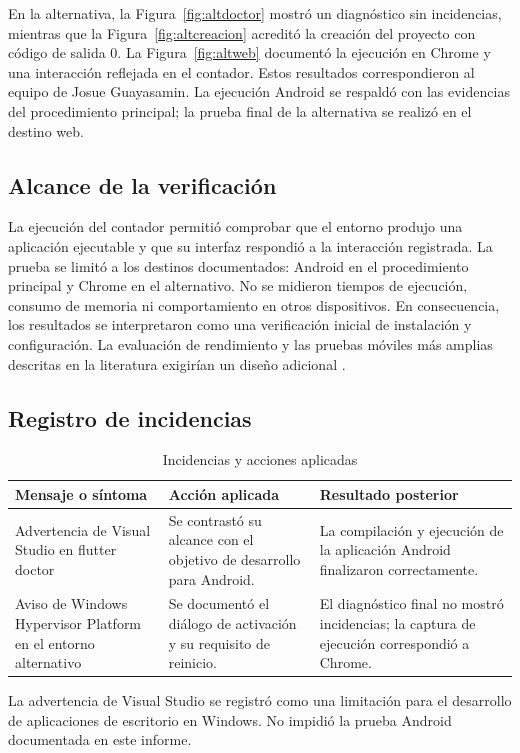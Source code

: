 \documentclass[12pt,letterpaper]{article}
\begin{document}
En la alternativa, la Figura~\ref{fig:altdoctor} mostró un diagnóstico sin incidencias, mientras que la Figura~\ref{fig:altcreacion} acreditó la creación del proyecto con código de salida 0. La Figura~\ref{fig:altweb} documentó la ejecución en Chrome y una interacción reflejada en el contador. Estos resultados correspondieron al equipo de Josue Guayasamin. La ejecución Android se respaldó con las evidencias del procedimiento principal; la prueba final de la alternativa se realizó en el destino web.

\subsection{Alcance de la verificación}
La ejecución del contador permitió comprobar que el entorno produjo una aplicación ejecutable y que su interfaz respondió a la interacción registrada. La prueba se limitó a los destinos documentados: Android en el procedimiento principal y Chrome en el alternativo. No se midieron tiempos de ejecución, consumo de memoria ni comportamiento en otros dispositivos. En consecuencia, los resultados se interpretaron como una verificación inicial de instalación y configuración. La evaluación de rendimiento y las pruebas móviles más amplias descritas en la literatura exigirían un diseño adicional \citep{biornhansen2020,muccini2012,ucinski2022}.

\subsection{Registro de incidencias}
\begin{table}[H]\centering
\caption{Incidencias y acciones aplicadas}\label{tab:incidencias}
\begin{tabular}{@{}p{4cm}p{4.5cm}p{4.3cm}@{}}\toprule
Mensaje o síntoma & Acción aplicada & Resultado posterior \\\midrule
Advertencia de Visual Studio en flutter doctor & Se contrastó su alcance con el objetivo de desarrollo para Android. & La compilación y ejecución de la aplicación Android finalizaron correctamente. \\
Aviso de Windows Hypervisor Platform en el entorno alternativo & Se documentó el diálogo de activación y su requisito de reinicio. & El diagnóstico final no mostró incidencias; la captura de ejecución correspondió a Chrome. \\
\bottomrule
\end{tabular}\end{table}
La advertencia de Visual Studio se registró como una limitación para el desarrollo de aplicaciones de escritorio en Windows. No impidió la prueba Android documentada en este informe.
\end{document}
